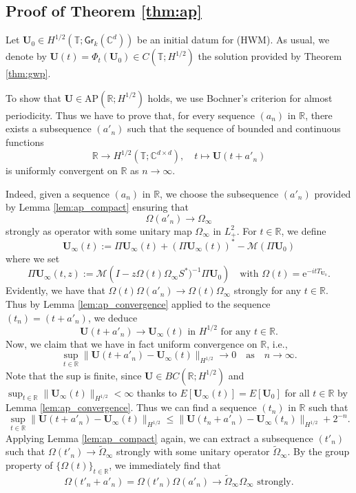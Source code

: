 \documentclass[10pt,reqno,a4paper]{amsart}
\theoremstyle{definition}
\theoremstyle{remark}
\theoremstyle{remark}
\numberwithin{equation}{section}
\newcommand{\AP}{\mathrm{AP}}
\newcommand{\C}{\mathbb{C}}
\newcommand{\R}{\mathbb{R}}
\newcommand{\T}{\mathbb{T}}
\newcommand{\Mean}{\mathscr{M}}
\newcommand{\be}{\begin{equation}}
\newcommand{\ee}{\end{equation}}
\newcommand{\eu}{\mathrm{e}}
\newcommand{\Ub}{\mathbf{U}}
\newcommand{\id}{I}
\newcommand{\Gr}{\mathsf{Gr}}
\newcommand{\Om}{\Omega}
\begin{document}
\subsection*{Proof of Theorem \ref{thm:ap}}
Let $\Ub_0 \in H^{1/2}(\T; \Gr_k(\C^d))$ be an initial datum for (HWM). As usual, we denote by $\Ub(t) = \Phi_t(\Ub_0) \in C(\T;H^{1/2})$ the solution provided by Theorem \ref{thm:gwp}.
 
To show that $\Ub \in \AP(\R; H^{1/2})$ holds, we use Bochner's criterion for almost periodicity. Thus we have to prove that, for every sequence $(a_n)$ in $\R$, there exists a subsequence $(a'_n)$ such that the sequence of bounded and continuous functions 
$$
\R \to H^{1/2}(\T; \C^{d \times d}), \quad t \mapsto \Ub(t+a'_n) 
$$
is uniformly convergent on $\R$ as $n \to \infty$. 

Indeed, given a sequence $(a_n)$ in $\R$, we choose the subsequence $(a'_n)$ provided by Lemma \ref{lem:ap_compact} ensuring that
$$
\Om(a'_n) \to \Om_\infty 
$$
strongly as operator with some unitary map $\Om_\infty$ in $L^2_+$. For $t \in \R$, we define 
$$
\Ub_\infty(t) := \Pi \Ub_\infty(t) + (\Pi \Ub_\infty(t))^* - \Mean(\Pi \Ub_0) 
$$
where we set
$$
\Pi \Ub_\infty(t,z) := \Mean \left ( \id- z \Om(t) \Om_\infty S^*)^{-1} \Pi \Ub_0 \right ) \quad \mbox{with $\Om(t)= \eu^{-it T_{\Ub_0}}$}.
$$
 Evidently, we have that $\Om(t) \Om(a'_n) \to \Om(t) \Om_\infty$ strongly for any $t \in \R$. Thus by Lemma \ref{lem:ap_convergence} applied to the sequence $(t_n) = (t +a'_n)$, we deduce 
$$
\mbox{$\Ub(t+a'_n) \to \Ub_\infty(t)$ in $H^{1/2}$ for any $t \in \R$}.
$$ 
 Now, we claim that we have in fact uniform convergence on $\R$, i.e.,
\be \label{ineq:ap_sup}
\sup_{t \in \R} \| \Ub(t+a'_n) - \Ub_\infty(t) \|_{H^{1/2}} \to 0 \quad \mbox{as} \quad n \to \infty.
\ee
Note that the sup is finite, since $\Ub \in BC(\R;H^{1/2})$ and $\sup_{t \in \R} \| \Ub_\infty(t) \|_{H^{1/2}}  < \infty$ thanks to $E[\Ub_\infty(t)] = E[\Ub_0]$ for all $t \in \R$ by Lemma \ref{lem:ap_convergence}. Thus we  can find a sequence $(t_n)$ in $\R$ such that
\be \label{ineq:ap_sup2}
\sup_{t \in \R} \| \Ub(t+a'_n) - \Ub_\infty(t) \|_{H^{1/2}} \leq \| \Ub(t_n + a'_n) - \Ub_\infty(t_n) \|_{H^{1/2}} + 2^{-n}.
\ee
 Applying Lemma \ref{lem:ap_compact} again, we can extract a subsequence $(t'_n)$ such that $\Om(t'_n) \to \widetilde{\Om}_\infty$ strongly with some unitary operator $\widetilde{\Om}_\infty$. By the group property of $\{ \Om(t) \}_{t \in \R}$, we immediately find that
 $$
\mbox{$\Om(t'_n + a'_n) = \Om(t'_n) \Om(a'_n) \to \widetilde{\Om}_\infty \Om_\infty$ strongly.}
$$
\end{document}
